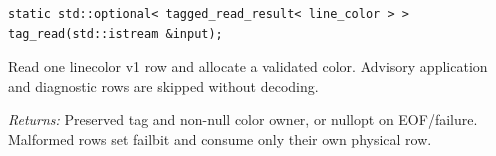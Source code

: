 \par\noindent\begin{minipage}{\linewidth}
\begin{lstlisting}[style=apireference]
static std::optional< tagged_read_result< line_color > > tag_read(std::istream &input);
\end{lstlisting}
{\footnotesize Read one linecolor v1 row and allocate a validated color. Advisory application and diagnostic rows are skipped without decoding.\par}
{\footnotesize\textit{Returns:} Preserved tag and non-null color owner, or nullopt on EOF/failure. Malformed rows set failbit and consume only their own physical row.\par}
\end{minipage}\par\vspace{1pt}
